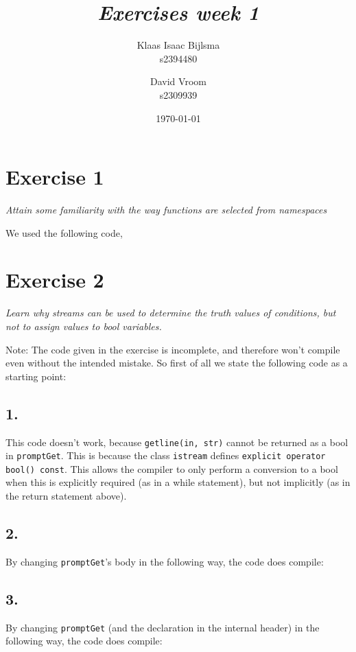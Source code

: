 \documentclass[12pt]{article}
\title{\itshape Exercises week 1}
\author{
	Klaas Isaac Bijlsma \\ s2394480
	\and
	David Vroom \\ s2309939
}
\date{\today}
\newcommand{\desc}[1]{\textit{#1} \vspace{1em}}
\begin{document}
\maketitle

\section*{Exercise 1}
\desc{Attain some familiarity with the way functions are selected from namespaces}

We used the following code,
%

\clearpage
\section*{Exercise 2}
\desc{Learn why streams can be used to determine the truth values of conditions, but not to assign values to bool variables.}

Note: The code given in the exercise is incomplete, and therefore won't compile even without the intended mistake. So first of all we state the following code as a starting point:






\subsection*{1.}
This code doesn't work, because \texttt{getline(in, str)} cannot be returned as a bool in \texttt{promptGet}. This is because the class \texttt{istream} defines \texttt{explicit operator bool() const}. This allows the compiler to only perform a conversion to a bool when this is explicitly required (as in a while statement), but not implicitly (as in the return statement above).

\subsection*{2.}
By changing \texttt{promptGet}'s body in the following way, the code does compile:


\subsection*{3.}
By changing \texttt{promptGet} (and the declaration in the internal header) in the following way, the code does compile:

\end{document}
